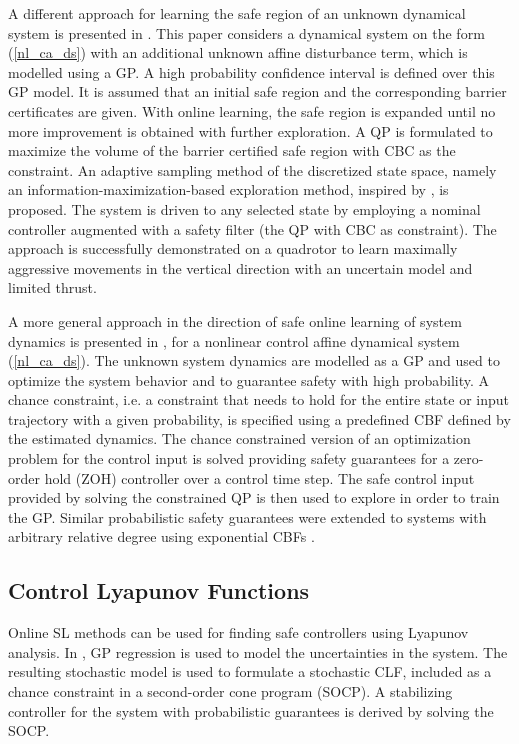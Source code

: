 \documentclass[3p,times,procedia]{elsarticle}
\begin{document}
A different approach for learning the safe region of an unknown dynamical system is presented in \cite{Wang2017}. This paper considers a dynamical system on the form (\ref{nl_ca_ds}) with an additional unknown affine disturbance term, which is modelled using a GP. A high probability confidence interval is defined over this GP model. It is assumed that an initial safe region and the corresponding barrier certificates are given. With online learning, the safe region is expanded until no more improvement is obtained with further exploration. A QP is formulated to maximize the volume of the barrier certified safe region with CBC as the constraint. An adaptive sampling method of the discretized state space, namely an information-maximization-based exploration method, inspired by \cite{Berkenkamp2016}, is proposed. The system is driven to any selected state by employing a nominal controller augmented with a safety filter (the QP with CBC as constraint). The approach is successfully demonstrated on a quadrotor to learn maximally aggressive movements in the vertical direction with an uncertain model and limited thrust. 

A more general approach in the direction of safe online learning of system dynamics is presented in \cite{Khojasteh2019}, for a nonlinear control affine dynamical system (\ref{nl_ca_ds}). The unknown system dynamics are modelled as a GP and used to optimize the system behavior and to guarantee safety with high probability. A chance constraint, i.e. a constraint that needs to hold for the entire state or input trajectory with a given probability, is specified using a predefined CBF defined by the estimated dynamics. The chance constrained version of an optimization problem for the control input is solved providing safety guarantees for a zero-order hold (ZOH) controller over a control time step. The safe control input provided by solving the constrained QP is then used to explore in order to train the GP. Similar probabilistic safety guarantees were extended to systems with arbitrary relative degree using exponential CBFs \cite{Ames2019}.


\subsection{Control Lyapunov Functions}\label{sec:online-clf}

Online SL methods can be used for finding safe controllers using Lyapunov analysis.  In \cite{Castaneda2020}, GP regression is used to model the uncertainties in the system. The resulting stochastic model is used to formulate a stochastic CLF, included as a chance constraint in a second-order cone program (SOCP). A stabilizing controller for the system with probabilistic guarantees is derived by solving the SOCP. 
\end{document}
